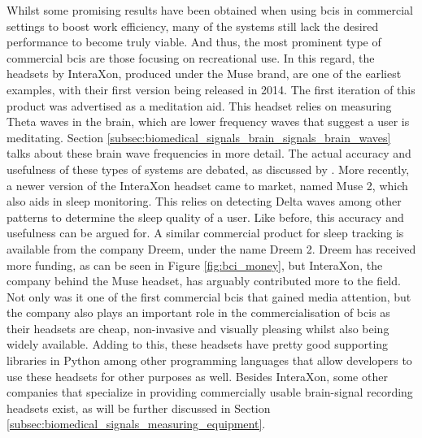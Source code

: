 Whilst some promising results have been obtained when using \glspl{bci} in commercial settings to boost work efficiency, many of the systems still lack the desired performance to become truly viable. 
And thus, the most prominent type of commercial \glspl{bci} are those focusing on recreational use.
In this regard, the headsets by InteraXon, produced under the Muse brand, are one of the earliest examples, with their first version being released in 2014.
The first iteration of this product was advertised as a meditation aid.
This headset relies on measuring Theta waves in the brain, which are lower frequency waves that suggest a user is meditating.
Section \ref{subsec:biomedical_signals_brain_signals_brain_waves} talks about these brain wave frequencies in more detail.
The actual accuracy and usefulness of these types of systems are debated, as discussed by \citet{interaxon_tests}.
More recently, a newer version of the InteraXon headset came to market, named Muse 2, which also aids in sleep monitoring.
This relies on detecting Delta waves among other patterns to determine the sleep quality of a user.
Like before, this accuracy and usefulness can be argued for.
A similar commercial product for sleep tracking is available from the company Dreem, under the name Dreem 2.
Dreem has received more funding, as can be seen in Figure \ref{fig:bci_money}, but InteraXon, the company behind the Muse headset, has arguably contributed more to the field.
Not only was it one of the first commercial \glspl{bci} that gained media attention, but the company also plays an important role in the commercialisation of \glspl{bci} as their headsets are cheap, non-invasive and visually pleasing whilst also being widely available. 
Adding to this, these headsets have pretty good supporting libraries in Python among other programming languages that allow developers to use these headsets for other purposes as well.
Besides InteraXon, some other companies that specialize in providing commercially usable brain-signal recording headsets exist, as will be further discussed in Section \ref{subsec:biomedical_signals_measuring_equipment}.

